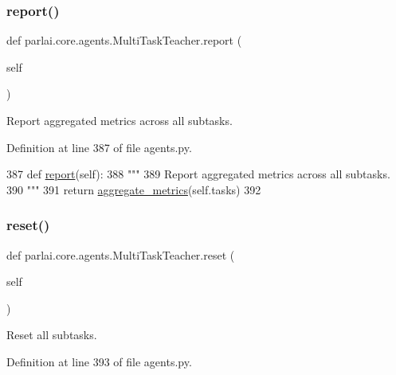 \subsubsection{\texorpdfstring{report()}{report()}}
{\footnotesize\ttfamily def parlai.\+core.\+agents.\+Multi\+Task\+Teacher.\+report (\begin{DoxyParamCaption}\item[{}]{self }\end{DoxyParamCaption})}

\begin{DoxyVerb}Report aggregated metrics across all subtasks.
\end{DoxyVerb}
 

Definition at line 387 of file agents.\+py.


\begin{DoxyCode}
387     \textcolor{keyword}{def }\hyperlink{namespaceprojects_1_1convai2_1_1eval__f1_a01a47b9c08dad189837a51f085defc45}{report}(self):
388         \textcolor{stringliteral}{"""}
389 \textcolor{stringliteral}{        Report aggregated metrics across all subtasks.}
390 \textcolor{stringliteral}{        """}
391         \textcolor{keywordflow}{return} \hyperlink{namespaceparlai_1_1core_1_1metrics_aa4ed5491962e06684b235fffe1b20fec}{aggregate\_metrics}(self.tasks)
392 
\end{DoxyCode}
\mbox{\label{classparlai_1_1core_1_1agents_1_1MultiTaskTeacher_ae4eeda38c4164498018ee6515050ae43}} 
\subsubsection{\texorpdfstring{reset()}{reset()}}
{\footnotesize\ttfamily def parlai.\+core.\+agents.\+Multi\+Task\+Teacher.\+reset (\begin{DoxyParamCaption}\item[{}]{self }\end{DoxyParamCaption})}

\begin{DoxyVerb}Reset all subtasks.
\end{DoxyVerb}
 

Definition at line 393 of file agents.\+py.


